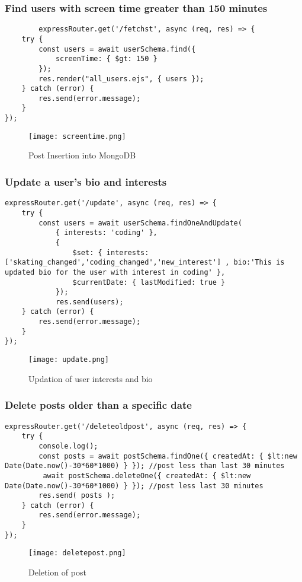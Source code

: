 \documentclass[12pt,a4paper]{article}
\begin{document}
\subsubsection{Find users with screen time greater than 150 minutes}
    \begin{lstlisting}
        expressRouter.get('/fetchst', async (req, res) => {
    try {
        const users = await userSchema.find({
            screenTime: { $gt: 150 }
        });
        res.render("all_users.ejs", { users });
    } catch (error) {
        res.send(error.message);
    }
});
    \end{lstlisting}
    \begin{figure}[H]
    \centering
    \texttt{[image: screentime.png]}

    \caption{Post Insertion into MongoDB}
    \label{fig:sample}
\end{figure}
    

\subsubsection{Update a user’s bio and interests}
    \begin{lstlisting}
expressRouter.get('/update', async (req, res) => {
    try {
        const users = await userSchema.findOneAndUpdate(
            { interests: 'coding' },
            {
                $set: { interests:['skating_changed','coding_changed','new_interest'] , bio:'This is updated bio for the user with interest in coding' },
                $currentDate: { lastModified: true }
            });
            res.send(users);
    } catch (error) {
        res.send(error.message);
    }
});
    \end{lstlisting}
    \begin{figure}[H]
    \centering
    \texttt{[image: update.png]}

    \caption{Updation of user interests and bio}
    \label{fig:sample}
\end{figure}
    

\subsubsection{Delete posts older than a specific date}
    \begin{lstlisting}
expressRouter.get('/deleteoldpost', async (req, res) => {
    try {
        console.log();
        const posts = await postSchema.findOne({ createdAt: { $lt:new Date(Date.now()-30*60*1000) } }); //post less than last 30 minutes
         await postSchema.deleteOne({ createdAt: { $lt:new Date(Date.now()-30*60*1000) } }); //post less last 30 minutes
        res.send( posts );
    } catch (error) {
        res.send(error.message);
    }
});
    \end{lstlisting}
    \begin{figure}[H]
    \centering
    \texttt{[image: deletepost.png]}

    \caption{Deletion of post}
    \label{fig:sample}
\end{figure}
    
\end{document}
